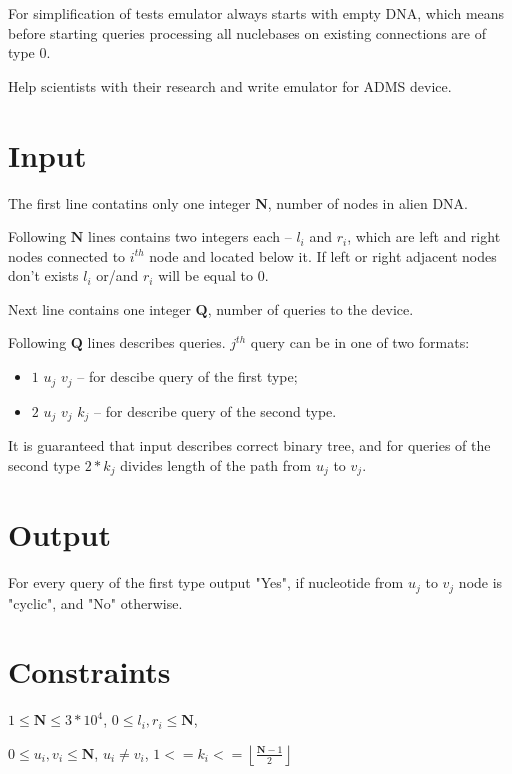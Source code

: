 \documentclass [11pt, a4paper, oneside, notitlepage] {article}
\begin{document}
For simplification of tests emulator always starts with empty DNA, which means before starting queries processing all nuclebases on existing connections are of type 0.

Help scientists with their research and write emulator for ADMS device.

\section*{Input}

The first line contatins only one integer $\mathbf{N}$, number of nodes in alien DNA.

Following $\mathbf{N}$ lines contains two integers each -- $l_i$ and $r_i$, which are left and right nodes connected to $i^{th}$ node and located below it. If left or right adjacent nodes don't exists $l_i$ or/and $r_i$ will be equal to $0$.

Next line contains one integer $\mathbf{Q}$, number of queries to the device.

Following $\mathbf{Q}$ lines describes queries. $j^{th}$ query can be in one of two formats:

\begin{itemize}
    \item $1$ $u_j$ $v_j$ -- for descibe query of the first type;
    \item $2$ $u_j$ $v_j$ $k_j$ -- for describe query of the second type.
\end{itemize}


It is guaranteed that input describes correct binary tree, and for queries of the second type $2 * k_j$ divides length of the path from $u_j$ to $v_j$.


\section*{Output}

For every query of the first type output "Yes", if nucleotide from $u_j$ to $v_j$ node is "cyclic", and "No" otherwise.


\section*{Constraints}
$1 \le \mathbf{N} \le 3 * 10^4$,
$0 \le l_i, r_i \le \mathbf{N}$,

$0 \le u_i, v_i \le \mathbf{N}$,
$u_i \neq v_i$,
$1 <= k_i <= \left\lfloor \frac{\mathbf{N} - 1}{2} \right\rfloor$
\end{document}

